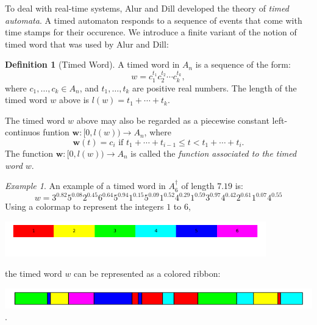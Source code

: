 \documentclass[10pt]{amsproc}
\theoremstyle{definition}
\newtheorem{definition}[theorem]{Definition}
\theoremstyle{remark}
\newtheorem{example}[theorem]{Example}
\begin{document}
To deal with real-time systems, Alur and Dill \cite{alur-dill} developed the theory of \emph{timed automata}.
A timed automaton responds to a sequence of events that come with time stamps for their occurence.
We introduce a finite variant of the notion of timed word that was used by Alur and Dill:
\begin{definition}
  [Timed Word]
  \label{definition:timed-word}
  A timed word in $A_n$ is a sequence of the form:
  \begin{displaymath}
    w=c_1^{t_1} c_2^{t_2}\dotsb c_k^{t_k},
  \end{displaymath}
  where $c_1,\dotsc,c_k\in A_n$, and $t_1,\dotsc,t_k$ are positive real numbers.
  The length of the timed word $w$ above is $l(w)=t_1+\dotsb+t_k$.
\end{definition}
The timed word $w$ above may also be regarded as a piecewise constant left-continuos funtion $\mathbf w:[0,l(w))\to A_n$, where
\begin{displaymath}
  \mathbf w(t) = c_i \text{ if } t_1+\dotsb+t_{i-1}\leq t < t_1+\dotsb + t_i.
\end{displaymath}
The function $\mathbf w:[0, l(w))\to A_n$ is called the \emph{function associated to the timed word $w$}.
\begin{example}
  \label{example:timed-word}
  An example of a timed word in $A_6^\dagger$ of length $7.19$ is:
  \begin{displaymath}
    w = 3^{0.82}5^{0.08}2^{0.45}6^{0.64}5^{0.94}1^{0.15}5^{0.09}1^{0.52}4^{0.29}1^{0.59}3^{0.97}4^{0.42}2^{0.61}1^{0.07}4^{0.55}
  \end{displaymath}
  Using a colormap to represent the integers $1$ to $6$,
  \begin{center}
    \includegraphics[width=0.85\textwidth]{colormap.png}
  \end{center}
  the timed word $w$ can be represented as a colored ribbon:
  \begin{center}
    \includegraphics[width=\textwidth]{word.png}.
  \end{center}
\end{example}
\end{document}
